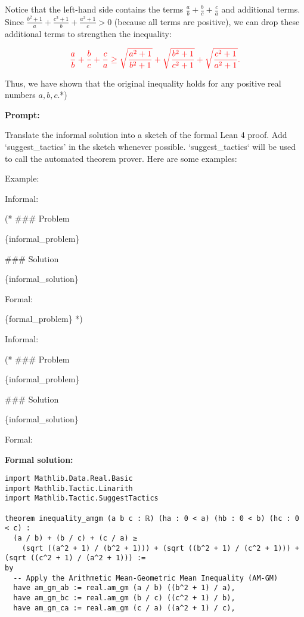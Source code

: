 \begin{tcolorbox}[breakable, enhanced, colback=black!5!white, colframe=black!75!white,  title=A Failed Case of \dsp]
{{\color{red} Notice that the left-hand side contains the terms $\frac{a}{b} + \frac{b}{c} + \frac{c}{a}$ and additional terms. Since $\frac{b^{2}+1}{a} + \frac{c^{2}+1}{b} + \frac{a^{2}+1}{c} > 0$ (because all terms are positive), we can drop these additional terms to strengthen the inequality:

$$
{\color{red} \frac{a}{b} + \frac{b}{c} + \frac{c}{a} \geq \sqrt{\frac{a^{2}+1}{b^{2}+1}} + \sqrt{\frac{b^{2}+1}{c^{2}+1}} + \sqrt{\frac{c^{2}+1}{a^{2}+1}}.}
$$}

Thus, we have shown that the original inequality holds for any positive real numbers $a, b, c$.*)

\tcbline

\textbf{Prompt:}

Translate the informal solution into a sketch of the formal Lean 4 proof. Add `suggest\_tactics' in the sketch whenever possible. `suggest\_tactics` will be used to call the automated theorem prover. Here are some examples:

Example:

Informal: 

(* \#\#\# Problem 

\{informal\_problem\} 

\#\#\# Solution 

\{informal\_solution\}

Formal: 

\{formal\_problem\}  *)

Informal: 

(* \#\#\# Problem 

\{informal\_problem\} 

\#\#\# Solution 

\{informal\_solution\}

Formal:

\tcbline



\textbf{Formal solution:}

\begin{lstlisting}
import Mathlib.Data.Real.Basic
import Mathlib.Tactic.Linarith
import Mathlib.Tactic.SuggestTactics

theorem inequality_amgm (a b c : ℝ) (ha : 0 < a) (hb : 0 < b) (hc : 0 < c) :
  (a / b) + (b / c) + (c / a) ≥
    (sqrt ((a^2 + 1) / (b^2 + 1))) + (sqrt ((b^2 + 1) / (c^2 + 1))) + (sqrt ((c^2 + 1) / (a^2 + 1))) :=
by
  -- Apply the Arithmetic Mean-Geometric Mean Inequality (AM-GM)
  have am_gm_ab := real.am_gm (a / b) ((b^2 + 1) / a),
  have am_gm_bc := real.am_gm (b / c) ((c^2 + 1) / b),
  have am_gm_ca := real.am_gm (c / a) ((a^2 + 1) / c),


\end{lstlisting}}
\end{tcolorbox}
